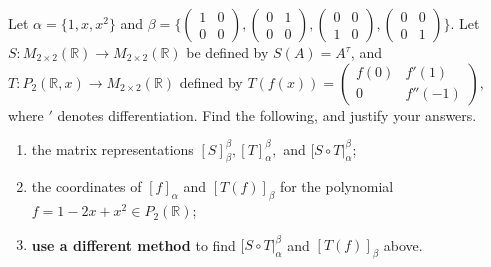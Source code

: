 \documentclass[12pt,answers]{exam}
\newcommand{\R}{\mathbb{R}}
\newenvironment{problem}[2][Problem]{\begin{trivlist}
\item[\hskip \labelsep {\bfseries #1}\hskip \labelsep {\bfseries #2.}]}{\end{trivlist}}
\begin{document}
\begin{problem}{2}
Let $\alpha=\{1,x,x^2\}$ and $\beta = \biggl \{ \begin{pmatrix} 1 & 0 \\ 0 & 0 \end{pmatrix}, \begin{pmatrix} 0 & 1 \\ 0 & 0 \end{pmatrix}, \begin{pmatrix} 0 & 0 \\ 1 & 0 \end{pmatrix}, \begin{pmatrix} 0 & 0 \\ 0 & 1 \end{pmatrix} \biggr \}$. \newline Let $S:M_{2\times 2}(\R)\rightarrow M_{2\times 2}(\R)$ be defined by $S(A)=A^{\tau}$, and $T:P_{2}(\R,x)\rightarrow M_{2\times 2}(\R)$ defined by $T(f(x))=\begin{pmatrix} f(0) & f'(1) \\ 0 & f''(-1) \end{pmatrix}$, where $'$ denotes differentiation. Find the following, and justify your answers.
\begin{enumerate}[label=\roman*)]
\item the matrix representations $[S]^{\beta}_{\beta},[T]^{\beta}_{\alpha},$ and $[S\circ T|^{\beta}_{\alpha}$;
\item the coordinates of $[f]_{\alpha}$ and $[T(f)]_{\beta}$ for the polynomial $f=1-2x+x^2\in P_{2}(\R)$;
\item \textbf{use a different method} to find $[S\circ T|^{\beta}_{\alpha}$ and $[T(f)]_{\beta}$ above.
\end{enumerate}
\end{problem}
\end{document}
